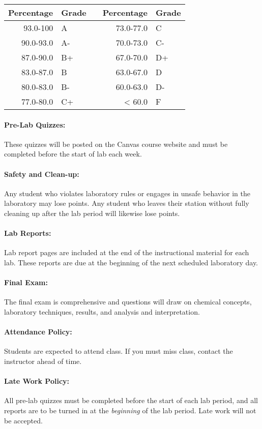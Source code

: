 \documentclass[12pt, letterpaper]{article}
\begin{document}
\begin{tabular}{rl|c|rl}
	Percentage & Grade &  & Percentage & Grade \\ \midrule
	  93.0-100 & A     &  &  73.0-77.0 & C     \\
	 90.0-93.0 & A-    &  &  70.0-73.0 & C-    \\
	 87.0-90.0 & B+    &  &  67.0-70.0 & D+    \\
	 83.0-87.0 & B     &  &  63.0-67.0 & D     \\
	 80.0-83.0 & B-    &  &  60.0-63.0 & D-    \\
	 77.0-80.0 & C+    &  &     < 60.0 & F
\end{tabular}
\paragraph{Pre-Lab Quizzes:}
These quizzes will be posted on the Canvas course website and must be completed before the start of lab each week.

\paragraph{Safety and Clean-up:}
Any student who violates laboratory rules or engages in unsafe behavior in the laboratory may lose points. Any student who leaves their station without fully cleaning up after the lab period will likewise lose points.

\paragraph{Lab Reports:}
Lab report pages are included at the end of the instructional material for each lab. These reports are due at the beginning of the next scheduled laboratory day.

\paragraph{Final Exam:}
The final exam is comprehensive and questions will draw on chemical concepts, laboratory techniques, results, and analysis and interpretation. 

\paragraph{Attendance Policy:}
Students are expected to attend class. If you must miss class, contact the instructor ahead of time.

\paragraph{Late Work Policy:}
All pre-lab quizzes must be completed before the start of each lab period, and all reports are to be turned in at the \emph{beginning} of the lab period. Late work will not be accepted.
\end{document}
